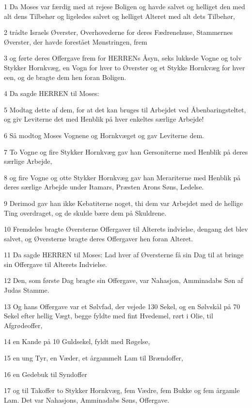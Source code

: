 \par 1 Da Moses var færdig med at rejese Boligen og havde salvet og helliget den med alt dens Tilbehør og ligeledes salvet og helliget Alteret med alt dets Tilbehør,
\par 2 trådte Israels Øverster, Overhovederne for deres Fædrenehuse, Stammernes Øverster, der havde forestået Mønstringen, frem
\par 3 og førte deres Offergave frem for HERRENs Åsyn, seks lukkede Vogne og tolv Stykker Hornkvæg, en Vogn for hver to Øverster og et Stykke Hornkvæg for hver een, og de bragte dem hen foran Boligen.
\par 4 Da sagde HERREN til Moses:
\par 5 Modtag dette af dem, for at det kan bruges til Arbejdet ved Åbenbaringsteltet, og giv Leviterne det med Henblik på hver enkeltes særlige Arbejde!
\par 6 Så modtog Moses Vognene og Hornkvæget og gav Leviterne dem.
\par 7 To Vogne og fire Stykker Hornkvæg gav han Gersoniterne med Henblik på deres særlige Arbejde,
\par 8 og fire Vogne og otte Stykker Hornkvæg gav han Merariterne med Henblik på deres særlige Arbejde under Itamars, Præsten Arons Søns, Ledelse.
\par 9 Derimod gav han ikke Kebatiterne noget, thi dem var Arbejdet med de hellige Ting overdraget, og de skulde bære dem på Skuldrene.
\par 10 Fremdeles bragte Øversterne Offergaver til Alterets indvielse, dengang det blev salvet, og Øversterne bragte deres Offergaver hen foran Alteret.
\par 11 Da sagde HERREN til Moses: Lad hver af Øversterne få sin Dag til at bringe sin Offergave til Alterets Indvielse.
\par 12 Den, som første Dag bragte sin Offergave, var Nahasjon, Amminadabs Søn af Judas Stamme.
\par 13 Og hans Offergave var et Sølvfad, der vejede 130 Sekel, og en Sølvskål på 70 Sekel efter hellig Vægt, begge fyldte med fint Hvedemel, rørt i Olie, til Afgrødeoffer,
\par 14 en Kande på 10 Guldsekel, fyldt med Røgelse,
\par 15 en ung Tyr, en Væder, et årgammelt Lam til Brændoffer,
\par 16 en Gedebuk til Syndoffer
\par 17 og til Takoffer to Stykker Hornkvæg, fem Vædre, fem Bukke og fem årgamle Lam. Det var Nahasjons, Amminadabs Søns, Offergave.
